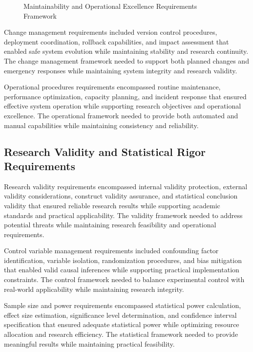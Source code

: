 \begin{figure}[H]
\centering
\caption{Maintainability and Operational Excellence Requirements Framework}
\label{fig:maintainability-operational-excellence}
\end{figure}

Change management requirements included version control procedures, deployment coordination, rollback capabilities, and impact assessment that enabled safe system evolution while maintaining stability and research continuity. The change management framework needed to support both planned changes and emergency responses while maintaining system integrity and research validity.

Operational procedures requirements encompassed routine maintenance, performance optimization, capacity planning, and incident response that ensured effective system operation while supporting research objectives and operational excellence. The operational framework needed to provide both automated and manual capabilities while maintaining consistency and reliability.

\subsection{Research Validity and Statistical Rigor Requirements}

Research validity requirements encompassed internal validity protection, external validity considerations, construct validity assurance, and statistical conclusion validity that ensured reliable research results while supporting academic standards and practical applicability. The validity framework needed to address potential threats while maintaining research feasibility and operational requirements.

Control variable management requirements included confounding factor identification, variable isolation, randomization procedures, and bias mitigation that enabled valid causal inferences while supporting practical implementation constraints. The control framework needed to balance experimental control with real-world applicability while maintaining research integrity.

Sample size and power requirements encompassed statistical power calculation, effect size estimation, significance level determination, and confidence interval specification that ensured adequate statistical power while optimizing resource allocation and research efficiency. The statistical framework needed to provide meaningful results while maintaining practical feasibility.

